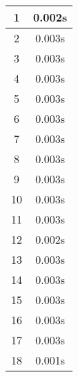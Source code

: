 \documentclass[11pt]{article}
\begin{document}
\begin{table}[!h]
\begin{center}
\begin{minipage}{0.48\textwidth}
\begin{tabular}{| c | c |}
				1 & 0.002s \\ \hline
				2 & 0.003s \\ \hline
				3 & 0.003s \\ \hline
				4 & 0.003s \\ \hline
				5 & 0.003s \\ \hline
				6 & 0.003s \\ \hline
				7 & 0.003s \\ \hline
				8 & 0.003s \\ \hline
				9 & 0.003s \\ \hline
				10 & 0.003s \\ \hline
				11 & 0.003s \\ \hline
				12 & 0.002s \\ \hline
				13 & 0.003s \\ \hline
				14 & 0.003s \\ \hline
				15 & 0.003s \\ \hline
				16 & 0.003s \\ \hline
				17 & 0.003s \\ \hline
				18 & 0.001s \\ \hline
			\end{tabular}
		\end{minipage}
	\end{center}
\end{table}

\pagebreak
\end{document}

